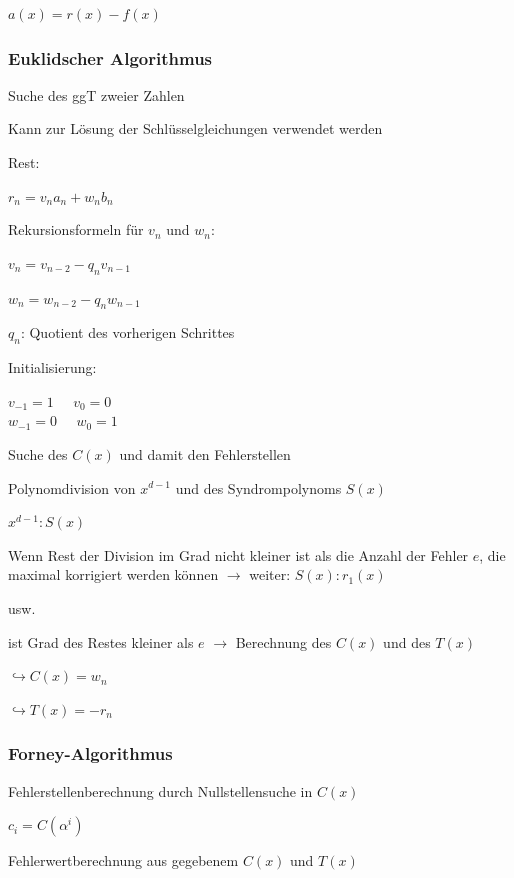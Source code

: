 $\displaystyle{
    a(x) = r(x) - f(x)
}$


\subsubsection{Euklidscher Algorithmus}

Suche des ggT zweier Zahlen

Kann zur Lösung der Schlüsselgleichungen verwendet werden

Rest:

$\displaystyle{
    r_n = v_n a_n + w_n b_n
}$

Rekursionsformeln für $v_n$ und $w_n$:

$\displaystyle{
    v_n = v_{n-2} - q_n v_{n-1}
}$

$\displaystyle{
    w_n = w_{n-2} - q_n w_{n-1}
}$

$q_n$: Quotient des vorherigen Schrittes

Initialisierung:

$\displaystyle{
    v_{-1} = 1 \;\;\;\;\; v_0 = 0
}$\\
$\displaystyle{
    w_{-1} = 0 \;\;\;\;\; w_0 = 1
}$

Suche des $C(x)$ und damit den Fehlerstellen

Polynomdivision von $x^{d-1}$ und des Syndrompolynoms $S(x)$

$\displaystyle{
    x^{d-1} : S(x)
}$

Wenn Rest der Division im Grad nicht kleiner ist als die Anzahl der Fehler $e$, die maximal korrigiert
werden können $\rightarrow$ weiter: $S(x) : r_1(x)$

usw.

ist Grad des Restes kleiner als $e$ $\rightarrow$ Berechnung des $C(x)$ und des $T(x)$

$\hookrightarrow C(x) = w_n$

$\hookrightarrow T(x) = -r_n$

\subsubsection{Forney-Algorithmus}

Fehlerstellenberechnung durch Nullstellensuche in $C(x)$

$\displaystyle{
    c_i = C(\alpha^i)
}$

Fehlerwertberechnung aus gegebenem $C(x)$ und $T(x)$

